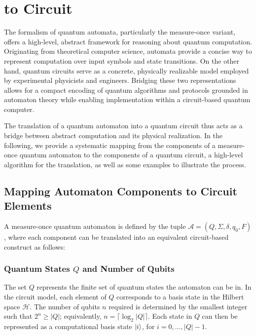 \section{ to Circuit}
\label{sec:moqfa-to-circuit}

The formalism of quantum automata, particularly the measure-once variant, offers a high-level, abstract framework for reasoning about quantum computation. Originating from theoretical computer science, automata provide a concise way to represent computation over input symbols and state transitions. On the other hand, quantum circuits serve as a concrete, physically realizable model employed by experimental physicists and engineers. Bridging these two representations allows for a compact encoding of quantum algorithms and protocols grounded in automaton theory while enabling implementation within a circuit-based quantum computer.

The translation of a quantum automaton into a quantum circuit thus acts as a bridge between abstract computation and its physical realization. In the following, we provide a systematic mapping from the components of a measure-once quantum automaton to the components of a quantum circuit, a high-level algorithm for the translation, as well as some examples to illustrate the process.

\subsection{Mapping Automaton Components to Circuit Elements}

A measure-once quantum automaton is defined by the tuple $\mathcal{A} = (Q, \Sigma, \delta, q_0, F)$, where each component can be translated into an equivalent circuit-based construct as follows:

\subsubsection{Quantum States $Q$ and Number of Qubits}

The set $Q$ represents the finite set of quantum states the automaton can be in. In the circuit model, each element of $Q$ corresponds to a basis state in the Hilbert space $\mathcal{H}$. The number of qubits $n$ required is determined by the smallest integer such that $2^n \geq |Q|$; equivalently, $n = \lceil \log_2 |Q| \rceil$. Each state in $Q$ can then be represented as a computational basis state $\ket{i}$, for $i = 0, \dots, |Q|-1$.


